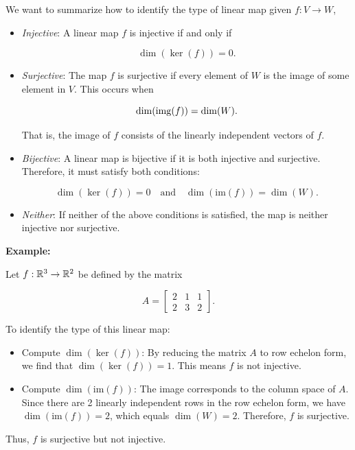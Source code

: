 We want to summarize how to identify the type of linear map given \( f: V \to W \),

\begin{itemize}

    \item \emph{Injective}: A linear map \( f \) is injective if and only if

    \[
        \dim(\ker(f)) = 0.
    \]

    \item \emph{Surjective}: The map \( f \) is surjective if every element of \( W \) is the 
    image of some element in \( V \). This occurs when

    \[
        \dim(\mathrm{img}(f)) = \dim(W).
    \]

    That is, the image of \( f \) consists of the linearly independent vectors of \(f\).

    \item \emph{Bijective}: A linear map is bijective if it is both injective and surjective. 
    Therefore, it must satisfy both conditions:
    
    \[
        \dim(\ker(f)) = 0 \quad \text{and} \quad \dim(\text{im}(f)) = \dim(W).
    \]
    
    \item \emph{Neither}: If neither of the above conditions is satisfied, the map is neither injective 
    nor surjective.

\end{itemize}

\textbf{Example:}

Let \( f: \mathbb{R}^3 \to \mathbb{R}^2 \) be defined by the matrix

\[
    A = \begin{bmatrix} 2 & 1 & 1 \\ 2 & 3 & 2 \end{bmatrix}.
\]

To identify the type of this linear map:

\begin{itemize}
    
    \item Compute \( \dim(\ker(f)) \): By reducing the matrix \( A \) to row echelon form, we find that 
    \( \dim(\ker(f)) = 1 \). This means \( f \) is not injective.
    
    \item Compute \( \dim(\text{im}(f)) \): The image corresponds to the column space of \( A \). Since 
    there are 2 linearly independent rows in the row echelon form, we have \( \dim(\text{im}(f)) = 2 \), 
    which equals \( \dim(W) = 2 \). Therefore, \( f \) is surjective.

\end{itemize}

Thus, \( f \) is surjective but not injective.


